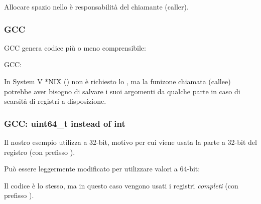 Allocare spazio nello  è responsabilità del chiamante (\gls{caller}).

\subsubsection{GCC}

\Optimizing GCC genera codice più o meno comprensibile:



\NonOptimizing GCC:




In System V *NIX (\SysVABI) non è richiesto lo , ma la funizone chiamata (\gls{callee}) potrebbe aver bisogno di salvare
i suoi argomenti da qualche parte in caso di scarsità di registri a disposizione.

\subsubsection{GCC: uint64\_t instead of int}

Il nostro esempio utilizza \Tint a 32-bit, motivo per cui viene usata la parte a 32-bit del registro (con prefisso ).

Può essere leggermente modificato per utilizzare valori a 64-bit:





Il codice è lo stesso, ma in questo caso vengono usati i registri \emph{completi} (con prefisso ).
